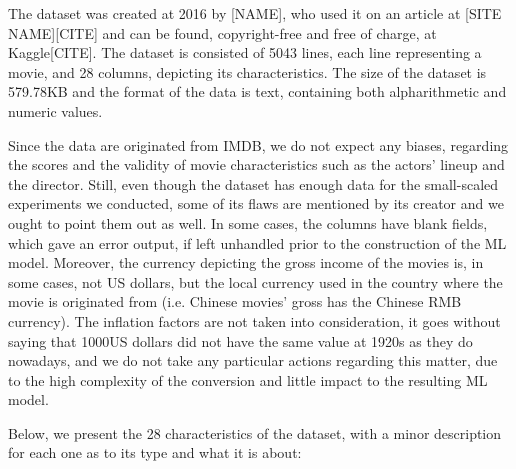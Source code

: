 \documentclass[letterpaper,twocolumn,10pt]{article}
\begin{document}
\par The dataset was created at 2016 by [NAME], who used it on an article at [SITE NAME][CITE] and can be found, copyright-free and free of charge, at Kaggle[CITE]. The dataset is consisted of 5043 lines, each line representing a movie, and 28 columns, depicting its characteristics. The size of the dataset is 579.78KB and the format of the data is text, containing both alpharithmetic and numeric values.\par Since the data are originated from IMDB, we do not expect any biases, regarding the scores and the validity of movie characteristics such as the actors' lineup and the director. Still, even though the dataset has enough data for the small-scaled experiments we conducted, some of its flaws are mentioned by its creator and we ought to point them out as well. In some cases, the columns have blank fields, which gave an error output, if left unhandled prior to the construction of the ML model. Moreover, the currency depicting the gross income of the movies is, in some cases, not US dollars, but the local currency used in the country where the movie is originated from (i.e. Chinese movies' gross has the Chinese RMB currency). The inflation factors are not taken into consideration, it goes without saying that 1000US dollars did not have the same value at 1920s as they do nowadays, and we do not take any particular actions regarding this matter, due to the high complexity of the conversion and little impact to the resulting ML model. \par Below, we present the 28 characteristics of the dataset, with a minor description for each one as to its type and what it is about:
\end{document}
